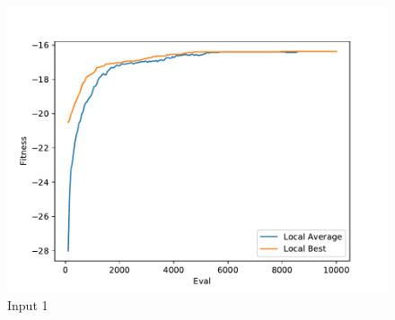 \documentclass{standalone}
\begin{document}
\begin{figure}[!htb]
	\caption{Input 1}
	\label{fig:graph_1013}
	\includegraphics[width=\textwidth]{../graphs/graphs/1013.pdf}
\end{figure}
\end{document}
